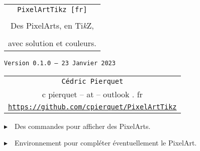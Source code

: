 \documentclass{article}
\def\TPversion{0.1.0}
\def\TPdate{23 Janvier 2023}
\begin{document}
\pagestyle{fancy}

\thispagestyle{empty}

\vspace{2cm}

\begin{center}
	\begin{minipage}{0.75\linewidth}
	\begin{tcolorbox}[colframe=yellow,colback=yellow!15]
		\begin{center}
			\begin{tabular}{c}
				{\Huge \texttt{PixelArtTikz [fr]}}\\
				\\
				{\LARGE Des PixelArts, en Ti\textit{k}Z}, \\
				\\
				{\LARGE avec solution et couleurs.} \\
			\end{tabular}
			
			\medskip
			
			{\small \texttt{Version \TPversion{} -- \TPdate}}
		\end{center}
	\end{tcolorbox}
\end{minipage}
\end{center}

\vspace{0.5cm}

\begin{center}
	\begin{tabular}{c}
	\texttt{Cédric Pierquet}\\
	{\ttfamily c pierquet -- at -- outlook . fr}\\
	\texttt{\url{https://github.com/cpierquet/PixelArtTikz}}
\end{tabular}
\end{center}

\vspace{0.25cm}

{$\blacktriangleright$~~Des commandes pour afficher des PixelArts.}

\smallskip

{$\blacktriangleright$~~Environnement pour compléter éventuellement le PixelArt.}

\smallskip

\vspace{1cm}
\end{document}
